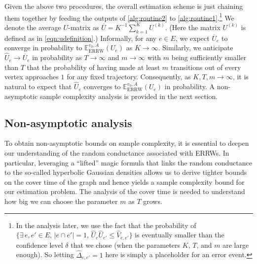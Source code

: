 \documentclass[a4paper, 11pt]{article}
\begin{document}
Given the above two procedures, the overall estimation scheme is just chaining them together by feeding the outputs of \cref{alg:routine2} to \cref{alg:routine1}.\footnote{
In the analysis later, we use the fact that the probability of $\{\exists\,e,e'\in E,\, |e \cap e'| =1,\, \hat{U}_e\hat{U}_{e'}\leq \hat{V}_{e,e'}\}$ is eventually smaller than the confidence level $\delta$ that we chose (when the parameters $K$, $T$, and $m$ are large enough). So letting $\hat{\Delta}_{e,e'}=1$ here is simply a placeholder for an error event. }  We denote the average \(U\)-matrix as \(\overline{U} = K^{-1} \sum_{k=1}^K U^{(k)}\). 
(Here the matrix $U^{(k)}$ is defined as in \cref{eqn:udefinition}.) Informally, for any \(e \in E\), we expect \(\overline{U}_e\) to converge in probability to \(\mathbb{E}_{\mathrm{ERRW}}^{v_0, A}(U_e)\) as \(K \to \infty\). Similarly, we anticipate \(\hat{U}_e \to \overline{U}_e\) in probability as \(T \to \infty\) and \( m \to \infty\) with $m$ being sufficiently smaller than $T$ that the probability of having made at least $m$ transitions out of every vertex approaches $1$ for any fixed trajectory. Consequently, as \(K, T, m \to \infty\), it is natural to expect that \(\hat{U}_e\) converges to \(\mathbb{E}_{\mathrm{ERRW}}^{v_0, A}(U_e)\) in probability. A non-asymptotic sample complexity analysis is provided in the next section.


\subsection{Non-asymptotic analysis}    \label{sec:nonasymptotic}

To obtain non-asymptotic bounds on sample complexity, it is essential to deepen our understanding of the
random conductance
associated with ERRWs. In particular, leveraging a ``lifted'' magic formula that links the random conductance to the so-called hyperbolic Gaussian densities allows us to derive tighter bounds on the cover time of the graph and hence yields a 
sample complexity bound
for our estimation problem. The analysis of the 
cover time is needed to understand how big we can choose the parameter $m$ as $T$ grows.
\end{document}
